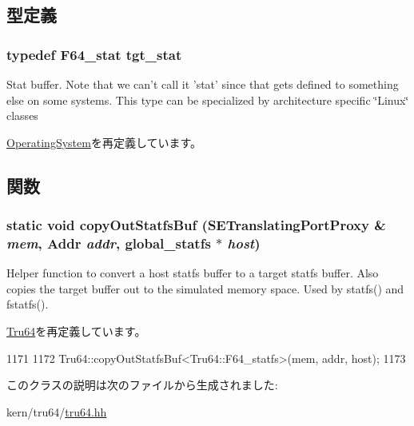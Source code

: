 \subsection{型定義}
\hypertarget{classTru64__F64_ae57fa534da0197e5bb73fbc40bd59a08}{
\subsubsection[{tgt\_\-stat}]{\setlength{\rightskip}{0pt plus 5cm}typedef {\bf F64\_\-stat} {\bf tgt\_\-stat}}}
\label{classTru64__F64_ae57fa534da0197e5bb73fbc40bd59a08}
Stat buffer. Note that we can't call it 'stat' since that gets defined to something else on some systems. This type can be specialized by architecture specific \char`\"{}Linux\char`\"{} classes 

\hyperlink{classOperatingSystem_a2b1f8be68cdf9781efbaf6e9cdbd8d02}{OperatingSystem}を再定義しています。

\subsection{関数}
\hypertarget{classTru64__F64_ab39f4973592abe61638b8b998bc5691d}{
\subsubsection[{copyOutStatfsBuf}]{\setlength{\rightskip}{0pt plus 5cm}static void copyOutStatfsBuf ({\bf SETranslatingPortProxy} \& {\em mem}, \/  {\bf Addr} {\em addr}, \/  {\bf global\_\-statfs} $\ast$ {\em host})}}
\label{classTru64__F64_ab39f4973592abe61638b8b998bc5691d}
Helper function to convert a host statfs buffer to a target statfs buffer. Also copies the target buffer out to the simulated memory space. Used by statfs() and fstatfs(). 

\hyperlink{classTru64_ab39f4973592abe61638b8b998bc5691d}{Tru64}を再定義しています。


\begin{DoxyCode}
1171     {
1172         Tru64::copyOutStatfsBuf<Tru64::F64_statfs>(mem, addr, host);
1173     }
\end{DoxyCode}


このクラスの説明は次のファイルから生成されました:\begin{DoxyCompactItemize}
\item 
kern/tru64/\hyperlink{kern_2tru64_2tru64_8hh}{tru64.hh}\end{DoxyCompactItemize}

